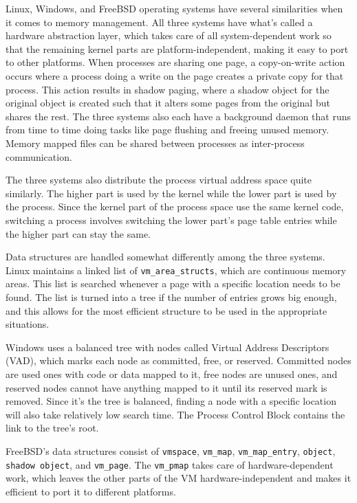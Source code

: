 \documentclass[10pt,draftclsnofoot,onecolumn,letterpaper]{IEEEtran}
\begin{document}
Linux, Windows, and FreeBSD operating systems have several similarities when it comes to memory management. All three systems have what's called a hardware abstraction layer, which takes care of all system-dependent work so that the remaining kernel parts are platform-independent, making it easy to port to other platforms\cite{15}. When processes are sharing one page, a copy-on-write action occurs where a process doing a write on the page creates a private copy for that process. This action results in shadow paging, where a shadow object for the original object is created such that it alters some pages from the original but shares the rest. The three systems also each have a background daemon that runs from time to time doing tasks like page flushing and freeing unused memory. Memory mapped files can be shared between processes as inter-process communication\cite{15}. \par
The three systems also distribute the process virtual address space quite similarly. The higher part is used by the kernel while the lower part is used by the process. Since the kernel part of the process space use the same kernel code, switching a process involves switching the lower part's page table entries while the higher part can stay the same\cite{15}. \par

\vspace{5mm}

Data structures are handled somewhat differently among the three systems. Linux maintains a linked list of \verb!vm_area_structs!, which are continuous memory areas. This list is searched whenever a page with a specific location needs to be found. The list is turned into a tree if the number of entries grows big enough, and this allows for the most efficient structure to be used in the appropriate situations\cite{15}. \par
Windows uses a balanced tree with nodes called Virtual Address Descriptors (VAD), which marks each node as committed, free, or reserved. Committed nodes are used ones with code or data mapped to it, free nodes are unused ones, and reserved nodes cannot have anything mapped to it until its reserved mark is removed. Since it's the tree is balanced, finding a node with a specific location will also take relatively low search time. The Process Control Block contains the link to the tree's root\cite{15}. \par
FreeBSD's data structures consist of \verb!vmspace!, \verb!vm_map!, \verb!vm_map_entry!, \verb!object!, \verb!shadow object!, and \verb!vm_page!. The \verb!vm_pmap! takes care of hardware-dependent work, which leaves the other parts of the VM hardware-independent and makes it efficient to port it to different platforms\cite{15}. \par
\end{document}
